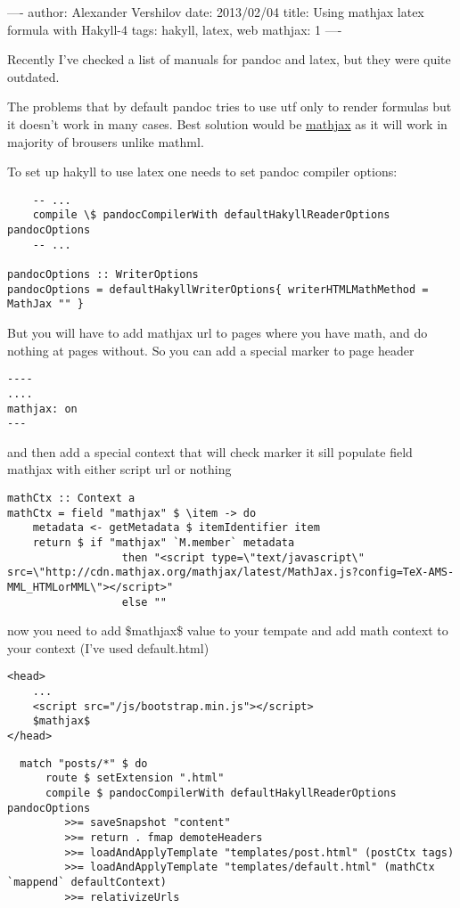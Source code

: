 ----
author: Alexander Vershilov
date: 2013/02/04
title: Using mathjax latex formula with Hakyll-4
tags: hakyll, latex, web
mathjax: 1
----

Recently I've checked a list of manuals for pandoc and latex, but they
were quite outdated.

The problems that by default pandoc tries to use utf only to render
formulas but it doesn't work in many cases. Best solution would be
\href{http://www.mathjax.org/}{mathjax} as it will work in majority of
brousers unlike mathml.

To set up hakyll to use latex one needs to set pandoc compiler options:

\begin{verbatim}
    -- ...
    compile \$ pandocCompilerWith defaultHakyllReaderOptions pandocOptions 
    -- ...

pandocOptions :: WriterOptions
pandocOptions = defaultHakyllWriterOptions{ writerHTMLMathMethod = MathJax "" }
\end{verbatim}

But you will have to add mathjax url to pages where you have math, and do
nothing at pages without. So you can add a special marker to page 
header

\begin{verbatim}
----
....
mathjax: on
---
\end{verbatim}

and then add a special context that will check marker it sill populate field
mathjax with either script url or nothing

\begin{verbatim}
mathCtx :: Context a
mathCtx = field "mathjax" $ \item -> do
    metadata <- getMetadata $ itemIdentifier item
    return $ if "mathjax" `M.member` metadata
                  then "<script type=\"text/javascript\" src=\"http://cdn.mathjax.org/mathjax/latest/MathJax.js?config=TeX-AMS-MML_HTMLorMML\"></script>"
                  else ""
\end{verbatim}

now you need to add \$mathjax\$ value to your tempate and add math context to
your context (I've used default.html)

\begin{verbatim}
<head>
    ...
    <script src="/js/bootstrap.min.js"></script>
    $mathjax$
</head>
\end{verbatim}

\begin{verbatim}
  match "posts/*" $ do
      route $ setExtension ".html"
      compile $ pandocCompilerWith defaultHakyllReaderOptions pandocOptions 
         >>= saveSnapshot "content"
         >>= return . fmap demoteHeaders
         >>= loadAndApplyTemplate "templates/post.html" (postCtx tags)
         >>= loadAndApplyTemplate "templates/default.html" (mathCtx `mappend` defaultContext)
         >>= relativizeUrls
\end{verbatim}

